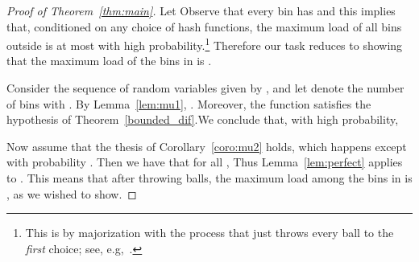 \documentclass[10pt,conference,letterpaper]{IEEEtran}
\begin{document}
\begin{proof}[Proof of Theorem~\ref{thm:main}]
Let 
Observe that every bin  has  and this implies that, conditioned on any choice of hash functions, the maximum load of all bins outside  is
at most  with high probability.\footnote{This is by majorization with the process that just throws every ball to the \emph{first}
    choice; see, e.g,~\citet{azar1999balanced-allocations}.} Therefore our task reduces to showing that the maximum load of the bins in  is .

Consider the sequence  of random variables given by , and let  denote the number of bins  with .
By Lemma~\ref{lem:mu1}, 
.
Moreover, the function 
satisfies the hypothesis of Theorem~\ref{bounded_dif}.We conclude that, with high probability, 

Now assume that the thesis of Corollary~\ref{coro:mu2} holds, which happens except with probability .
Then we have that for all , 
Thus Lemma~\ref{lem:perfect} applies to . This means that after throwing  balls, the maximum load among the bins in  is , as
we wished to show.
\end{proof}
\end{document}
